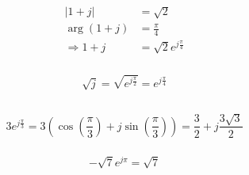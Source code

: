 \documentclass[]{article}
\begin{document}
\subsection{}

\subsubsection{}

\begin{align}
	|1 + j| &= \sqrt{2} \\
	\arg(1 + j) &= \frac{\pi}{4} \\
	\Rightarrow 1 + j &= \sqrt{2} e^{j \frac{\pi}{4}}
\end{align}

\subsubsection{}

\begin{equation}
	\sqrt{j} = \sqrt{e^{j \frac{\pi}{2}}} = e^{j \frac{\pi}{4}}
\end{equation}

\subsection{}

\subsubsection{}

\begin{equation}
	3e^{j \frac{\pi}{3}} = 3\left(\cos\left(\frac{\pi}{3}\right) + j \sin\left(\frac{\pi}{3}\right)\right) = \frac{3}{2} + j \frac{3\sqrt{3}}{2}
\end{equation}

\subsubsection{}

\begin{equation}
	-\sqrt{7} e^{j \pi} = \sqrt{7}
\end{equation}

\subsection{}

\subsubsection{}
\end{document}
